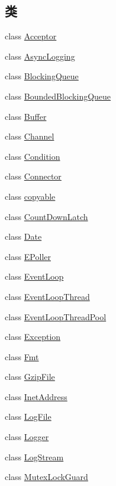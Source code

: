 \subsection*{类}
\begin{DoxyCompactItemize}
\item 
class \hyperlink{classmuduo_1_1Acceptor}{Acceptor}
\item 
class \hyperlink{classmuduo_1_1AsyncLogging}{Async\+Logging}
\item 
class \hyperlink{classmuduo_1_1BlockingQueue}{Blocking\+Queue}
\item 
class \hyperlink{classmuduo_1_1BoundedBlockingQueue}{Bounded\+Blocking\+Queue}
\item 
class \hyperlink{classmuduo_1_1Buffer}{Buffer}
\item 
class \hyperlink{classmuduo_1_1Channel}{Channel}
\item 
class \hyperlink{classmuduo_1_1Condition}{Condition}
\item 
class \hyperlink{classmuduo_1_1Connector}{Connector}
\item 
class \hyperlink{classmuduo_1_1copyable}{copyable}
\item 
class \hyperlink{classmuduo_1_1CountDownLatch}{Count\+Down\+Latch}
\item 
class \hyperlink{classmuduo_1_1Date}{Date}
\item 
class \hyperlink{classmuduo_1_1EPoller}{E\+Poller}
\item 
class \hyperlink{classmuduo_1_1EventLoop}{Event\+Loop}
\item 
class \hyperlink{classmuduo_1_1EventLoopThread}{Event\+Loop\+Thread}
\item 
class \hyperlink{classmuduo_1_1EventLoopThreadPool}{Event\+Loop\+Thread\+Pool}
\item 
class \hyperlink{classmuduo_1_1Exception}{Exception}
\item 
class \hyperlink{classmuduo_1_1Fmt}{Fmt}
\item 
class \hyperlink{classmuduo_1_1GzipFile}{Gzip\+File}
\item 
class \hyperlink{classmuduo_1_1InetAddress}{Inet\+Address}
\item 
class \hyperlink{classmuduo_1_1LogFile}{Log\+File}
\item 
class \hyperlink{classmuduo_1_1Logger}{Logger}
\item 
class \hyperlink{classmuduo_1_1LogStream}{Log\+Stream}
\item 
class \hyperlink{classmuduo_1_1MutexLockGuard}{Mutex\+Lock\+Guard}

\end{DoxyCompactItemize}
